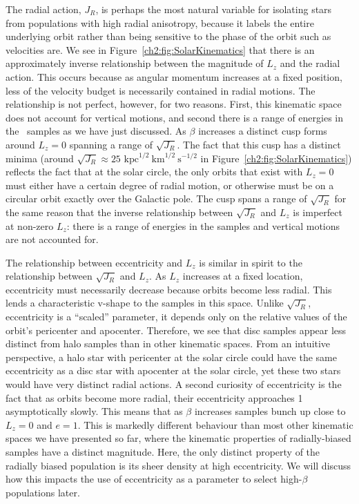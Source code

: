 The radial action, $J_{R}$, is perhaps the most natural variable for isolating stars from populations with high radial anisotropy, because it labels the entire underlying orbit rather than being sensitive to the phase of the orbit such as velocities are. We see in Figure~\ref{ch2:fig:SolarKinematics} that there is an approximately inverse relationship between the magnitude of $L_{z}$ and the radial action. This occurs because as angular momentum increases at a fixed position, less of the velocity budget is necessarily contained in radial motions. The relationship is not perfect, however, for two reasons. First, this kinematic space does not account for vertical motions, and second there is a range of energies in the \solar\ samples as we have just discussed. As $\beta$ increases a distinct cusp forms around $L_{z}=0$ spanning a range of $\sqrt{J_{R}}$. The fact that this cusp has a distinct minima (around $\sqrt{J_{R}}\approx25$ $\mathrm{kpc}^{1/2}~\mathrm{km}^{1/2}~\mathrm{s}^{-1/2}$ in Figure~\ref{ch2:fig:SolarKinematics}) reflects the fact that at the solar circle, the only orbits that exist with $L_{z}=0$ must either have a certain degree of radial motion, or otherwise must be on a circular orbit exactly over the Galactic pole. The cusp spans a range of $\sqrt{J_{R}}$ for the same reason that the inverse relationship between $\sqrt{J_{R}}$ and $L_{z}$ is imperfect at non-zero $L_{z}$: there is a range of energies in the samples and vertical motions are not accounted for.

The relationship between eccentricity and $L_{z}$ is similar in spirit to the relationship between $\sqrt{J_{R}}$ and $L_{z}$. As $L_{z}$ increases at a fixed location, eccentricity must necessarily decrease because orbits become less radial. This lends a characteristic v-shape to the samples in this space. Unlike $\sqrt{J_{R}}$, eccentricity is a ``scaled'' parameter, it depends only on the relative values of the orbit's pericenter and apocenter. Therefore, we see that disc samples appear less distinct from halo samples than in other kinematic spaces. From an intuitive perspective, a halo star with pericenter at the solar circle could have the same eccentricity as a disc star with apocenter at the solar circle, yet these two stars would have very distinct radial actions. A second curiosity of eccentricity is the fact that as orbits become more radial, their eccentricity approaches 1 asymptotically slowly. This means that as $\beta$ increases samples bunch up close to $L_{z}=0$ and $e=1$. This is markedly different behaviour than most other kinematic spaces we have presented so far, where the kinematic properties of radially-biased samples have a distinct magnitude. Here, the only distinct property of the radially biased population is its sheer density at high eccentricity. We will discuss how this impacts the use of eccentricity as a parameter to select high-$\beta$ populations later.

